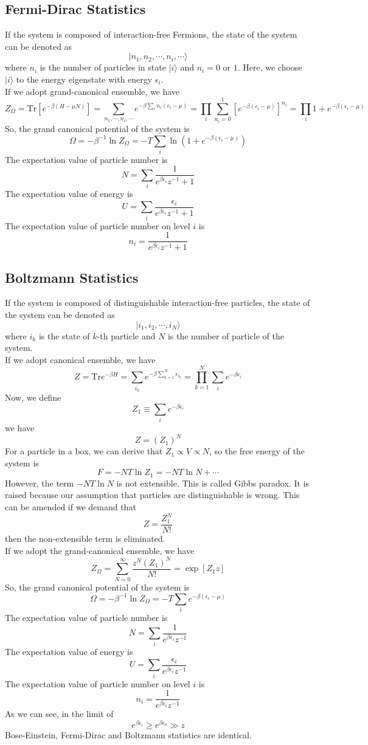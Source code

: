 \subsection{Fermi-Dirac Statistics}
If the system is composed of interaction-free Fermions, the state of the system can be denoted as
\[|n_1,n_2,\cdots,n_i,\cdots\rangle\] where $n_i$ is the number of particles in state $|i\rangle$ and $n_i = 0$ or $1$. Here, we choose $|i\rangle$ to the energy eigenstate with energy $\epsilon_i$.
\\
If we adopt grand-canonical ensemble, we have
\[Z_{\Omega} = \mathrm{Tr}[e^{-\beta(H-\mu N)}] = \sum_{n_1,\cdots,n_i,\cdots} e^{-\beta \sum_{i}n_i(\epsilon_i-\mu)} = \prod_{i}\sum_{n_i=0}^{1}[e^{-\beta(\epsilon_i-\mu)}]^{n_i} = \prod_{i} 1+e^{-\beta(\epsilon_i - \mu)}\]
So, the grand canonical potential of the system is
\[\Omega = -\beta^{-1}\ln Z_{\Omega} = -T \sum_i \ln (1 + e^{-\beta(\epsilon_i - \mu)})\]
The expectation value of particle number is
\[N = \sum_i \frac{1}{e^{\beta \epsilon_i}z^{-1}+1}\]
The expectation value of energy is
\[U = \sum_i \frac{\epsilon_i}{e^{\beta \epsilon_i}z^{-1}+1}\]
The expectation value of particle number on level $i$ is
\[n_i =  \frac{1}{e^{\beta \epsilon_i}z^{-1}+1}\]

\subsection{Boltzmann Statistics}
If the system is composed of distinguishable interaction-free particles, the state of the system can be denoted as
\[|i_1,i_2,\cdots,i_N\rangle\] where $i_k$ is the state of $k$-th particle and $N$ is the number of particle of the system. 
\\
If we adopt canonical ensemble, we have
\[Z =　\mathrm{Tr} e^{-\beta H} = \sum_{i_k} e^{-\beta\sum_{k=1}^N \epsilon_{i_k}} = \prod_{k=1}^N \sum_i e^{-\beta \epsilon_i}\]
Now, we define
\[Z_1 \equiv \sum_i e^{-\beta \epsilon_i}\] we have
\[Z = (Z_1)^N\]
For a particle in a box, we can derive that $Z_1 \propto V \propto N$, so the free energy of the system is
\[F = -NT\ln Z_1 = -NT\ln N + \cdots\]
However, the term $-NT\ln N$ is not extensible. This is called Gibbs paradox. It is raised because our assumption that particles are distinguishable is wrong. This can be amended if we demand that
\[Z = \frac{Z_1^N}{N!}\]
then the non-extensible term is eliminated.
\\ 
If we adopt the grand-canonical ensemble, we have
\[Z_{\Omega} = \sum_{N=0}^{\infty} \frac{z^N (Z_1)^N}{N!} = \exp[Z_1 z]\]
So, the grand canonical potential of the system is
\[\Omega = -\beta^{-1}\ln Z_{\Omega} = -T \sum_i e^{-\beta(\epsilon_i-\mu)}\]
The expectation value of particle number is
\[N = \sum_i \frac{1}{e^{\beta \epsilon_i}z^{-1}}\]
The expectation value of energy is
\[U = \sum_i \frac{\epsilon_i}{e^{\beta \epsilon_i}z^{-1}}\]
The expectation value of particle number on level $i$ is
\[n_i =  \frac{1}{e^{\beta \epsilon_i}z^{-1}}\]
As we can see, in the limit of
\[e^{\beta\epsilon_i} \geq e^{\beta\epsilon_0}  \gg z\] Bose-Einstein, Fermi-Dirac and Boltzmann statistics are identical.  

